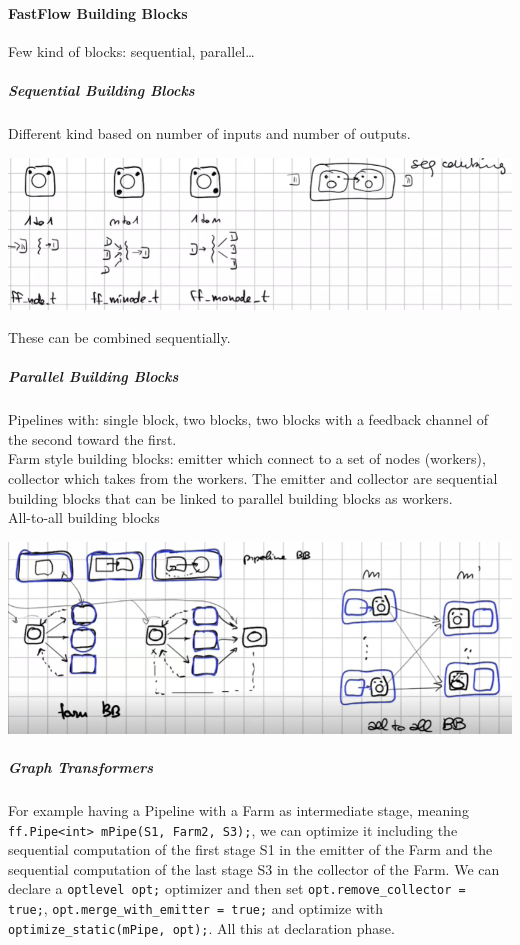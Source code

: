 \documentclass[10pt]{report}
\begin{document}
\paragraph{FastFlow Building Blocks} Few kind of blocks: sequential, parallel\ldots
\subparagraph{Sequential Building Blocks} Different kind based on number of inputs and number of outputs.
\begin{center}
	\includegraphics[scale=0.5]{22.png}
\end{center}
These can be combined sequentially.
\subparagraph{Parallel Building Blocks} Pipelines with: single block, two blocks, two blocks with a feedback channel of the second toward the first.\\
Farm style building blocks: emitter which connect to a set of nodes (workers), collector which takes from the workers. The emitter and collector are sequential building blocks that can be linked to parallel building blocks as workers.\\
All-to-all building blocks
\begin{center}
	\includegraphics[scale=0.5]{23.png}
\end{center}
\subparagraph{Graph Transformers} For example having a Pipeline with a Farm as intermediate stage, meaning \texttt{ff.Pipe<int> mPipe(S1, Farm2, S3);}, we can optimize it including the sequential computation of the first stage S1 in the emitter of the Farm and the sequential computation of the last stage S3  in the collector of the Farm. We can declare a \texttt{optlevel opt;} optimizer and then set \texttt{opt.remove\_collector = true;}, \texttt{opt.merge\_with\_emitter = true;} and optimize with \texttt{optimize\_static(mPipe, opt);}. All this at declaration phase.
\end{document}
